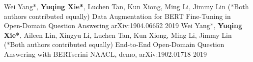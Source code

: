 

\begin{cventries}

\cventry
    {Wei Yang*, \textbf{Yuqing Xie*}, Luchen Tan, Kun Xiong, Ming Li, Jimmy Lin (*Both authors contributed equally)}
    {Data Augmentation for BERT Fine-Tuning in Open-Domain Question Answering} %
    {arXiv:1904.06652} %
    {2019} %
    {
    }
\cventry
    {Wei Yang*, \textbf{Yuqing Xie*}, Aileen Lin, Xingyu Li, Luchen Tan, Kun Xiong, Ming Li, Jimmy Lin (*Both authors contributed equally)}
    {End-to-End Open-Domain Question Answering with BERTserini} %
    {NAACL, demo, arXiv:1902.01718} %
    {2019} %
    {
    }

\end{cventries}
